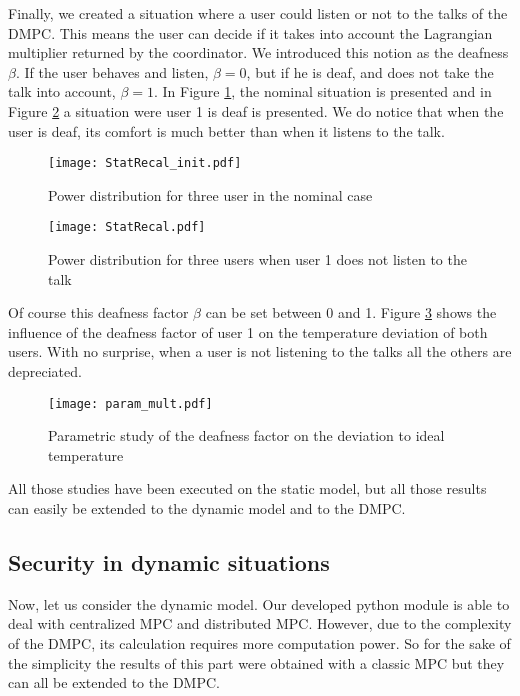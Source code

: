 \documentclass[conference, peerreview]{IEEEtran}
\begin{document}

Finally, we created a situation where a user could listen or not to the talks of the DMPC. This means the user can decide if it takes into account the Lagrangian multiplier returned by the coordinator. We introduced this notion as the deafness $\beta$. If the user behaves and listen, $\beta = 0$, but if he is deaf,  and does not take the talk into account,  $\beta =1$. In Figure \ref{SRecal_i}, the nominal situation is presented and in Figure \ref{SRecal_} a situation were user 1 is deaf is presented. We do notice that when the user is deaf, its comfort is much better than when it listens to the talk. 
\begin{figure}[H]
\centering
\texttt{[image: StatRecal\_init.pdf]}
\caption{Power distribution for three user in the nominal case}
\label{SRecal_i}
\end{figure}

\begin{figure}[H]
\centering
\texttt{[image: StatRecal.pdf]}
\caption{Power distribution for three users when user 1 does not listen to the talk}
\label{SRecal_}
\end{figure}
Of course this deafness factor $\beta$ can be set between 0 and 1. Figure \ref{SRecal_mult} shows the influence of the deafness factor of user 1 on the temperature deviation of both users. With no surprise, when a user is not listening to the talks all the others are depreciated.
\begin{figure}[H]
\centering
\texttt{[image: param\_mult.pdf]}
\caption{Parametric study of the deafness factor on the deviation to ideal temperature}
\label{SRecal_mult}
\end{figure}

All those studies have been executed on the static model, but all those results can easily be extended to the dynamic model and to the DMPC. 

\subsection{Security in dynamic situations}
Now, let us consider the dynamic model. Our developed python module is able to deal with centralized MPC and distributed MPC. However, due to the complexity of the DMPC, its calculation requires more computation power. So for the sake of the simplicity the results of this part were obtained with a classic MPC but they can all be extended to the DMPC.  
\end{document}
